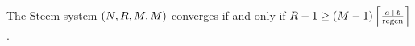 \begin{theorem}
  \label{theorem:convergence:steem}
  The Steem system $\left(\playerlen, \rounds, \postlen,
  \postlen\right)$-converges if and only if $\rounds - 1 \geq \left(\postlen -
  1\right) \ceil*{\frac{a + b}{\regen}}$.
\end{theorem}
